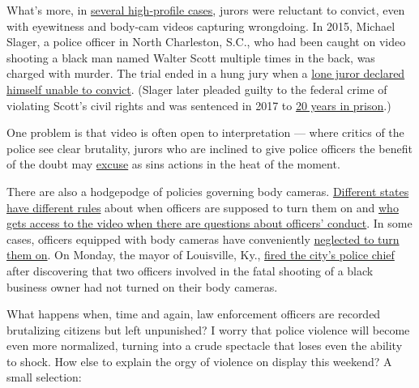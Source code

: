 What's more, in
\href{https://www.vox.com/policy-and-politics/2017/7/21/15983842/police-body-cameras-failures}{several
high-profile cases}, jurors were reluctant to convict, even with
eyewitness and body-cam videos capturing wrongdoing. In 2015, Michael
Slager, a police officer in North Charleston, S.C., who had been caught
on video shooting a black man named Walter Scott multiple times in the
back, was charged with murder. The trial ended in a hung jury when a
\href{https://www.nbcnews.com/news/crime-courts/jury-says-it-s-deadlocked-trial-officer-who-shot-walter-n691291}{lone
juror declared himself unable to convict}. (Slager later pleaded guilty
to the federal crime of violating Scott's civil rights and was sentenced
in 2017 to
\href{https://www.nytimes3xbfgragh.onion/2017/12/07/us/michael-slager-sentence-walter-scott.html}{20
years in prison}.)

One problem is that video is often open to interpretation --- where
critics of the police see clear brutality, jurors who are inclined to
give police officers the benefit of the doubt may
\href{https://www.cnn.com/2017/06/16/us/philando-castile-trial-verdict/index.html}{excuse}
as sins actions in the heat of the moment.

There are also a hodgepodge of policies governing body cameras.
\href{https://www.brennancenter.org/our-work/research-reports/police-body-worn-camera-policies}{Different
states have different rules} about when officers are supposed to turn
them on and
\href{https://www.abc10.com/article/news/local/release-of-police-body-cam-video-policies-varies-between-agencies/103-530783929}{who
gets access to the video when there are questions about officers'
conduct}. In some cases, officers equipped with body cameras have
conveniently
\href{https://www.vox.com/policy-and-politics/2017/7/17/15985442/minneapolis-police-shooting-justine-damond-video}{neglected
to turn them on}. On Monday, the mayor of Louisville, Ky.,
\href{https://www.cbsnews.com/news/steve-conrad-louisville-police-chief-fired-protest-shooting-death/}{fired
the city's police chief} after discovering that two officers involved in
the fatal shooting of a black business owner had not turned on their
body cameras.

What happens when, time and again, law enforcement officers are recorded
brutalizing citizens but left unpunished? I worry that police violence
will become even more normalized, turning into a crude spectacle that
loses even the ability to shock. How else to explain the orgy of
violence on display this weekend? A small selection:

